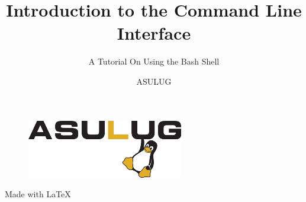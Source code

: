 \documentclass[11pt]{beamer}
\begin{document}
	\author{ASULUG}
	\title{Introduction to the Command Line Interface}
	\subtitle{A Tutorial On Using the Bash Shell}
	\begin{frame}[plain]
	\maketitle
	\begin{figure}
		\includegraphics[scale=2]{asulug-logo.png}
	\end{figure}
	Made with \LaTeX
\end{frame}
\end{document}
